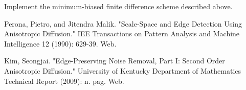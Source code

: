 \begin{problem}
Implement the minimum-biased finite difference scheme described above. 
\end{problem}

Perona, Pietro, and Jitendra Malik. "Scale-Space and Edge Detection Using Anisotropic Diffusion." IEE Transactions on Pattern Analysis and Machine Intelligence 12 (1990): 629-39. Web.

Kim, Seongjai. "Edge-Preserving Noise Removal, Part I: Second Order Anisotropic Diffusion." University of Kentucky Department of Mathematics Technical Report (2009): n. pag. Web.